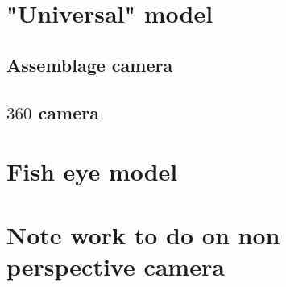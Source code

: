 
\section{"Universal" model}

\subsection{Assemblage camera}
\subsection{$360$ camera}

\section{Fish eye model}
\label{SecFE}



\section{Note work to do on non perspective camera}




%
%
%


